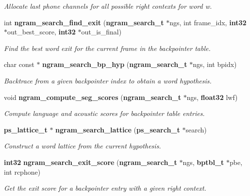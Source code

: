 \begin{DoxyCompactItemize}
\begin{DoxyCompactList}\small\item\em \-Allocate last phone channels for all possible right contexts for word w. \end{DoxyCompactList}\item 
int {\bf ngram\-\_\-search\-\_\-find\-\_\-exit} ({\bf ngram\-\_\-search\-\_\-t} $\ast$ngs, int frame\-\_\-idx, {\bf int32} $\ast$out\-\_\-best\-\_\-score, {\bf int32} $\ast$out\-\_\-is\-\_\-final)
\begin{DoxyCompactList}\small\item\em \-Find the best word exit for the current frame in the backpointer table. \end{DoxyCompactList}\item 
char const $\ast$ {\bf ngram\-\_\-search\-\_\-bp\-\_\-hyp} ({\bf ngram\-\_\-search\-\_\-t} $\ast$ngs, int bpidx)
\begin{DoxyCompactList}\small\item\em \-Backtrace from a given backpointer index to obtain a word hypothesis. \end{DoxyCompactList}\item 
void {\bf ngram\-\_\-compute\-\_\-seg\-\_\-scores} ({\bf ngram\-\_\-search\-\_\-t} $\ast$ngs, {\bf float32} lwf)\label{ngram__search_8h_a2fa760c99f77eb075157304f4359941e}

\begin{DoxyCompactList}\small\item\em \-Compute language and acoustic scores for backpointer table entries. \end{DoxyCompactList}\item 
{\bf ps\-\_\-lattice\-\_\-t} $\ast$ {\bf ngram\-\_\-search\-\_\-lattice} ({\bf ps\-\_\-search\-\_\-t} $\ast$search)\label{ngram__search_8h_ac30e7dec4bbfeee9f5163abf4bbd1014}

\begin{DoxyCompactList}\small\item\em \-Construct a word lattice from the current hypothesis. \end{DoxyCompactList}\item 
{\bf int32} {\bf ngram\-\_\-search\-\_\-exit\-\_\-score} ({\bf ngram\-\_\-search\-\_\-t} $\ast$ngs, {\bf bptbl\-\_\-t} $\ast$pbe, int rcphone)\label{ngram__search_8h_a25a80e488425b2bd4e24eb753c9295a5}

\begin{DoxyCompactList}\small\item\em \-Get the exit score for a backpointer entry with a given right context. \end{DoxyCompactList}\end{DoxyCompactItemize}


